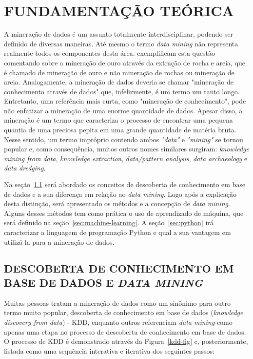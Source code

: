 \chapter{FUNDAMENTAÇÃO TEÓRICA}\label{ch:fundaments-teorico}
A mineração de dados é um assunto totalmente interdisciplinar, podendo ser definido de diversas maneiras. Até mesmo o termo \textit{data mining} não representa realmente todos os componentes desta área.  exemplificam esta questão comentando sobre a mineração de ouro através da extração de rocha e areia, que é chamado de mineração de ouro e não mineração de rochas ou mineração de areia. Analogamente, a mineração de dados deveria se chamar "mineração de conhecimento através de dados" que, infelizmente, é um termo um tanto longo. Entretanto, uma referência mais curta, como "mineração de conhecimento", pode não enfatizar a mineração de uma enorme quantidade de dados. Apesar disso, a mineração é um termo que caracteriza o processo de encontrar uma pequena quantia de uma preciosa pepita em uma grande quantidade de matéria bruta. Nesse sentido, um termo impróprio contendo ambos \textit{"data"} e \textit{"mining"} se tornou popular e, como consequência, muitos outros nomes similares surgiram: \textit{knowledge mining from data}, \textit{knowledge extraction}, \textit{data/pattern analysis}, \textit{data archaeology} e \textit{data dredging}.

Na seção~\ref{sec:kdd} será abordado os conceitos de descoberta de conhecimento em base de dados e a sua diferença em relação ao \textit{data mining}. Logo após a explicação desta distinção, será apresentado os métodos e a concepção de \textit{data mining}. Alguns desses métodos tem como prática o uso de aprendizado de máquina, que será definido na seção~\ref{sec:machine-learning}. A seção~\ref{sec:python} irá caracterizar a linguagem de programação Python e qual a sua vantagem em utilizá-la para a mineração de dados.

\section{DESCOBERTA DE CONHECIMENTO EM BASE DE DADOS E \textit{DATA MINING}}\label{sec:kdd}
Muitas pessoas tratam a mineração de dados como um sinônimo para outro termo muito popular, descoberta de conhecimento em base de dados (\textit{knowledge discovery from data}) - KDD, enquanto outros referenciam \textit{data mining} como apenas uma etapa no processo de descoberta de conhecimento em base de dados. O processo de KDD é demonstrado através da  Figura~\ref{kdd-fig} e, posteriormente, listada como uma sequência interativa e iterativa dos seguintes passos: \\ \\ \\ \\ \\ \\

